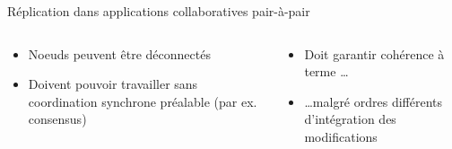 \begin{frame}[fragile]{Réplication dans applications collaboratives pair-à-pair}
\begin{figure}
{
        }
    \end{figure}
    \vspace{-1em}
    \begin{columns}
        \hspace{0em}
        \begin{column}{0.6\textwidth}
            \begin{itemize}
                \item<2-> Noeuds peuvent être \alert{déconnectés}
                \item<3-> Doivent pouvoir \alert{travailler sans coordination synchrone} préalable (par ex. consensus)
            \end{itemize}
        \end{column}
        \begin{column}{0.6\textwidth}
            \begin{itemize}
                \item<9-> Doit garantir \alert{cohérence à terme} \cite{10.1145/224057.224070}\dots
                \item<9-> \dots malgré ordres différents d'intégration des modifications
            \end{itemize}
        \end{column}
    \end{columns}
\end{frame}

